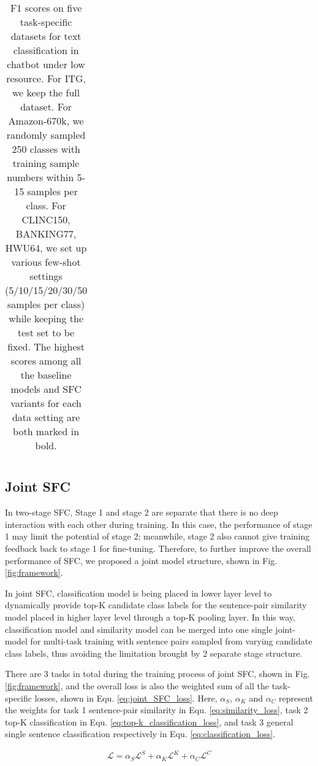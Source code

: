 \begin{table*}
\begin{centering}
{\begin{tabular}{|c|cccccc|cccccc|cccccc|c|c|}
        & & & & & & & & & & & & & & & & & & & &\tabularnewline
        \hline
      \end{tabular}
    }
    \par
  \end{centering}
  \caption{
    F1 scores  on  five  task-specific  datasets for text classification in chatbot
    under low resource. For ITG, we keep the full dataset. For Amazon-670k, we
    randomly  sampled  250  classes  with  training sample numbers within 5-15
    samples  per  class.  For  CLINC150,  BANKING77,  HWU64, we set up various
    few-shot  settings  (5/10/15/20/30/50 samples per class) while keeping the
    test  set to be fixed. The highest scores among all the baseline models and SFC variants for each data setting are both marked
    in bold.
  }
  \label{tbe:table2}
\end{table*}



\subsection{Joint SFC}
In  two-stage  SFC,  Stage  1  and  stage 2 are separate that there is no deep
interaction  with each other during training. In this case, the performance of
stage  1  may  limit  the potential of stage 2; meanwhile, stage 2 also cannot
give  training feedback back to stage 1 for fine-tuning. Therefore, to further
improve  the  overall performance of SFC, we proposed a joint model structure,
shown in Fig. \ref{fig:framework}.

In  joint  SFC,  classification  model is being placed in lower layer level to
dynamically  provide  top-K  candidate  class  labels  for  the  sentence-pair
similarity  model  placed in higher layer level through a top-K pooling layer.
In  this way, classification model and similarity model can be merged into one
single  joint-model  for  multi-task training with sentence pairs sampled from
varying  candidate  class  labels,  thus  avoiding the limitation brought by 2
separate stage structure.

There  are 3 tasks in total during the training process of joint SFC, shown in
Fig. \ref{fig:framework}, and the overall loss is also the weighted sum of all
the   task-specific  losses,  shown  in  Equ.  \ref{eq:joint_SFC_loss}.  Here,
$\alpha_S$,  $\alpha_K$  and  $\alpha_C$  represent  the  weights  for  task 1
sentence-pair  similarity  in  Equ.  \ref{eq:similarity_loss},  task  2  top-K
classification  in Equ. \ref{eq:top-k_classification_loss}, and task 3 general
single       sentence       classification      respectively      in      Equ.
\ref{eq:classification_loss}.

\begin{align}
  \mathcal{L} = \alpha_S \mathcal{L}^S + \alpha_K \mathcal{L}^K + \alpha_C \mathcal{L}^C
  \label{eq:joint_SFC_loss}
\end{align}

